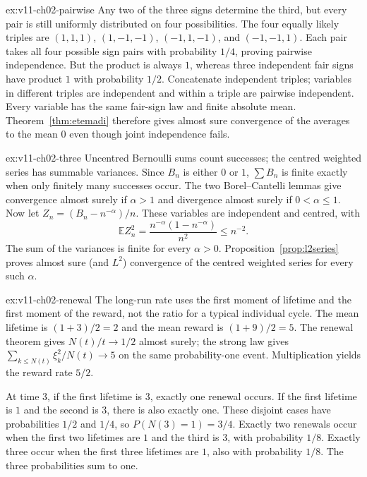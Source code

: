 \begin{solution}{ex:v11-ch02-pairwise}
\idea Any two of the three signs determine the third, but every pair is still uniformly distributed on four possibilities.
\writeup The four equally likely triples are $(1,1,1)$, $(1,-1,-1)$, $(-1,1,-1)$, and $(-1,-1,1)$. Each pair takes all four possible sign pairs with probability $1/4$, proving pairwise independence. But the product is always $1$, whereas three independent fair signs have product $1$ with probability $1/2$. Concatenate independent triples; variables in different triples are independent and within a triple are pairwise independent. Every variable has the same fair-sign law and finite absolute mean. Theorem~\ref{thm:etemadi} therefore gives almost sure convergence of the averages to the mean $0$ even though joint independence fails.
\end{solution}

\begin{solution}{ex:v11-ch02-three}
\idea Uncentred Bernoulli sums count successes; the centred weighted series has summable variances.
\writeup Since $B_n$ is either $0$ or $1$, $\sum B_n$ is finite exactly when only finitely many successes occur. The two Borel--Cantelli lemmas give convergence almost surely if $\alpha>1$ and divergence almost surely if $0<\alpha\le1$. Now let $Z_n=(B_n-n^{-\alpha})/n$. These variables are independent and centred, with
\[
\mathbb E Z_n^2=\frac{n^{-\alpha}(1-n^{-\alpha})}{n^2}\le n^{-2}.
\]
The sum of the variances is finite for every $\alpha>0$. Proposition~\ref{prop:l2series} proves almost sure (and $L^2$) convergence of the centred weighted series for every such $\alpha$.
\end{solution}

\begin{solution}{ex:v11-ch02-renewal}
\idea The long-run rate uses the first moment of lifetime and the first moment of the reward, not the ratio for a typical individual cycle.
\writeup The mean lifetime is $(1+3)/2=2$ and the mean reward is $(1+9)/2=5$. The renewal theorem gives $N(t)/t\to1/2$ almost surely; the strong law gives $\sum_{k\le N(t)}\xi_k^2/N(t)\to5$ on the same probability-one event. Multiplication yields the reward rate $5/2$.

At time $3$, if the first lifetime is $3$, exactly one renewal occurs. If the first lifetime is $1$ and the second is $3$, there is also exactly one. These disjoint cases have probabilities $1/2$ and $1/4$, so $P(N(3)=1)=3/4$. Exactly two renewals occur when the first two lifetimes are $1$ and the third is $3$, with probability $1/8$. Exactly three occur when the first three lifetimes are $1$, also with probability $1/8$. The three probabilities sum to one.
\end{solution}


